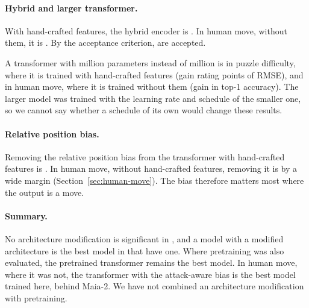 \documentclass[11pt]{article}
\begin{document}
\paragraph{Hybrid and larger transformer.}
With hand-crafted features, the hybrid encoder is
. In human move,
without them, it is
. By the
acceptance criterion,  are accepted.

A transformer with
 million
parameters instead of
million is
in puzzle difficulty, where it is trained with hand-crafted features (gain
rating points of RMSE), and
 in human
move, where it is trained without them (gain
 in top-1
accuracy). The larger model was trained with the learning rate and schedule
of the smaller one, so we cannot say whether a schedule of its own would
change these results.

\paragraph{Relative position bias.}
Removing the relative position bias from the transformer with hand-crafted
features is . In
human move, without hand-crafted features, removing it is
by a wide margin (Section~\ref{sec:human-move}). The bias therefore matters
most where the output is a move.

\paragraph{Summary.}
No architecture modification is significant in ,
and a model with a modified architecture is the best model in
 that have one. Where pretraining was also evaluated,
the pretrained transformer remains the best model. In human move, where it
was not, the transformer with the attack-aware bias is the best model
trained here, behind Maia-2. We have not combined an architecture
modification with pretraining.
\end{document}
